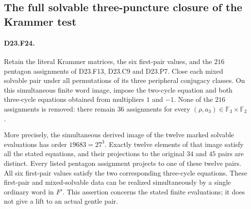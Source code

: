 \subsection{The full solvable three-puncture closure of the Krammer test}

\paragraph{D23.F24.}
Retain the literal Krammer matrices, the six first-pair values, and
the $216$ pentagon assignments of D23.F13, D23.C9 and D23.P7.
Close each mixed solvable pair under all permutations of its three
peripheral conjugacy classes.  On this simultaneous finite word image,
impose the two-cycle equation and both three-cycle equations obtained
from multipliers $1$ and $-1$.  None of the $216$ assignments is removed:
there remain $36$ assignments for every $(\rho,a_3)\in
\mathbb F_3\times\mathbb F_2$.

More precisely, the simultaneous derived image of the twelve marked
solvable evaluations has order $19683=27^3$.  Exactly twelve elements
of that image satisfy all the stated equations, and their projections
to the original $34$ and $45$ pairs are distinct.  Every listed
pentagon assignment projects to one of these twelve pairs.  All six
first-pair values satisfy the two corresponding three-cycle equations.
These first-pair and mixed-solvable data can be realized simultaneously
by a single ordinary word in $F'$.  This assertion concerns the stated
finite evaluations; it does not give a lift to an actual gentle pair.

